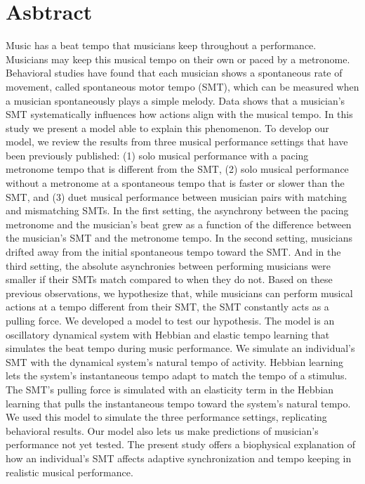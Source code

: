 \documentclass{report}
\begin{document}
\section{Asbtract}
Music has a beat tempo that musicians keep throughout a performance. Musicians may keep this musical tempo on their own or paced by a metronome. Behavioral studies have found that each musician shows a spontaneous rate of movement, called spontaneous motor tempo (SMT), which can be measured when a musician spontaneously plays a simple melody. Data shows that a musician's SMT systematically influences how actions align with the musical tempo. In this study we present a model able to explain this phenomenon. To develop our model, we review the results from three musical performance settings that have been previously published: (1) solo musical performance with a pacing metronome tempo that is different from the SMT, (2) solo musical performance without a metronome at a spontaneous tempo that is faster or slower than the SMT, and (3) duet musical performance between musician pairs with matching and mismatching SMTs. In the first setting, the asynchrony between the pacing metronome and the musician's beat grew as a function of the difference between the musician's SMT and the metronome tempo. In the second setting, musicians drifted away from the initial spontaneous tempo toward the SMT. And in the third setting, the absolute asynchronies between performing musicians were smaller if their SMTs match compared to when they do not. Based on these previous observations, we hypothesize that, while musicians can perform musical actions at a tempo different from their SMT, the SMT constantly acts as a pulling force. We developed a model to test our hypothesis. The model is an oscillatory dynamical system with Hebbian and elastic tempo learning that simulates the beat tempo during music performance. We simulate an individual's SMT with the dynamical system's natural tempo of activity. Hebbian learning lets the system's instantaneous tempo adapt to match the tempo of a stimulus. The SMT's pulling force is simulated with an elasticity term in the Hebbian learning that pulls the instantaneous tempo toward the system's natural tempo. We used this model to simulate the three performance settings, replicating behavioral results. Our model also lets us make predictions of musician's performance not yet tested. The present study offers a biophysical explanation of how an individual's SMT affects adaptive synchronization and tempo keeping in realistic musical performance.
\end{document}
